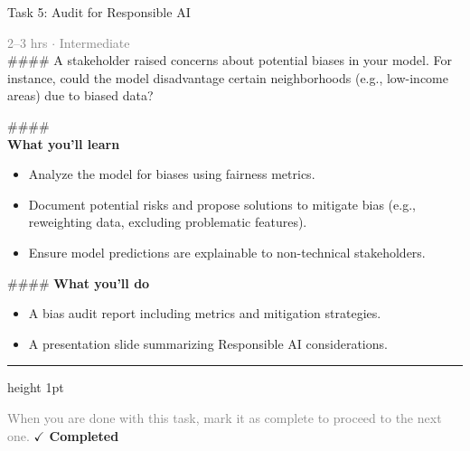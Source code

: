 \documentclass[10pt,a4paper]{article}
\begin{document}
\begin{taskbox}{Task 5: Audit for Responsible AI}

    {\small \textcolor{gray}{2--3 hrs $\cdot$ Intermediate}}\\[12pt]

    \#\#\#\# 
A stakeholder raised concerns about potential biases in your model. For instance, could the model disadvantage certain neighborhoods (e.g., low-income areas) due to biased data?

\#\#\#\# \\[10pt]
\vspace{8pt}
{\large \textbf{\textcolor{brandLight}{What you'll learn}}}\\[4pt]
\begin{itemize}
    \item Analyze the model for biases using fairness metrics.
    \item Document potential risks and propose solutions to mitigate bias (e.g., reweighting data, excluding problematic features).
    \item Ensure model predictions are explainable to non-technical stakeholders.
\end{itemize}

\#\#\#\# \vspace{8pt}
{\large \textbf{\textcolor{brandLight}{What you'll do}}}\\[4pt]
\begin{itemize}
    \item A bias audit report including metrics and mitigation strategies.
    \item A presentation slide summarizing Responsible AI considerations.\par
\end{itemize}

    \vspace{16pt}

    \textcolor{cardBorder}{\hrule height 1pt}\vspace{8pt}

    \small \textcolor{gray}{When you are done with this task, mark it as complete to proceed to the next one.} \hfill \textbf{\textcolor{brandDark}{$\checkmark$ Completed}}

\end{taskbox}
\end{document}
